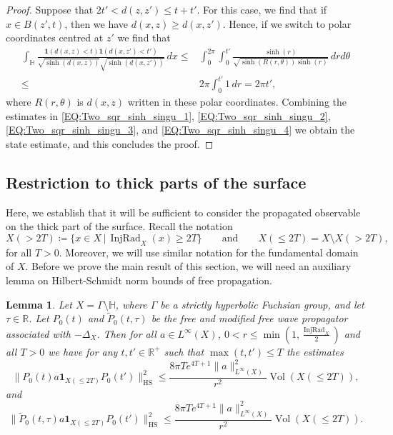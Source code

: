 \documentclass[11pt,twoside,reqno]{amsart}
\newcommand{\R}{\mathbb{R}}
\newcommand{\bH}{\mathbb{H}}
\newcommand{\1}{\mathrm{\mathbf{1}}}
\newcommand{\bHS}{\mathrm{HS}}
\DeclareMathOperator{\Vol}{Vol}
\DeclareMathOperator{\InjRad}{InjRad}
\numberwithin{equation}{section}
\theoremstyle{plain}
\newtheorem{lemma}[thm]{Lemma}
\theoremstyle{definition}
\theoremstyle{remark}
\begin{document}
\begin{proof}
Suppose that $2t'<d(z,z') \leq t+t'$. For this case, we find that if $x\in B(z',t)$, then we have $d(x,z)\geq d(x,z')$. Hence, if we switch to polar coordinates centred at $z'$ we find that
\begin{equation}\label{EQ:Two_sqr_sinh_singu_4}
    \begin{aligned}
        \int_{\bH} \frac{\boldsymbol{1}(d(x,z)<t)\boldsymbol{1}(d(x,z')<t')}{\sqrt{\sinh(d(x,z)) }\sqrt{\sinh(d(x,z')) }} \, d x  \leq{}&  \int_0^{2\pi} \int_0^{t'} \frac{\sinh(r)}{\sqrt{\sinh(R(r,\theta)) \sinh(r)}} \, d r d\theta 
        \\
        \leq{}& 2\pi   \int_0^{t'} 1 \, d r = 2\pi t', 
    \end{aligned}
\end{equation}
where $R(r,\theta)$ is $d(x,z)$ written in these polar coordinates. Combining the estimates in \eqref{EQ:Two_sqr_sinh_singu_1}, \eqref{EQ:Two_sqr_sinh_singu_2}, \eqref{EQ:Two_sqr_sinh_singu_3}, and \eqref{EQ:Two_sqr_sinh_singu_4} we obtain the state estimate, and this concludes the proof. 
\end{proof}

\subsection{Restriction to thick parts of the surface} 

Here, we establish that it will be sufficient to consider the propagated observable on the thick part of the surface. Recall the notation
%
\begin{equation*}
    X(> 2T) \coloneqq \{ x\in X \,|\, \InjRad_X(x) \geq 2T \} \qquad\text{and}\qquad X(\leq 2T) = X\setminus X(> 2T),
\end{equation*}
for all $T>0$. Moreover, we will use similar notation for the fundamental domain of $X$. Before we prove the main result of this section, we will need an auxiliary lemma on Hilbert-Schmidt norm bounds of free propagation. 

\begin{lemma}\label{LE:free_propagation_restriction_1}
    Let $X=\Gamma\setminus \bH$, where $\Gamma$ be a strictly hyperbolic Fuchsian group, and let $\tau\in\R$. Let $P_0(t)$ and $\widetilde{P}_0(t,\tau)$ be the free and modified free wave propagator associated with $-\Delta_X$. Then for all $a\in L^\infty(X)$, $0<r\leq \min(1, \frac{\InjRad_X}{2})$ and all $T>0$ we have for any $t,t'\in \R^+$ such that $\max(t,t')\leq T$ the estimates
    \begin{equation*}
        \big\lVert  P_0(t) a \boldsymbol{1}_{X(\leq2T)} P_0(t')   \big\rVert_{\bHS}^2 \leq \frac{8\pi T e^{4T+1} \lVert a \rVert^2_{L^\infty(X)}}{r^2} \Vol(X(\leq2T)),
    \end{equation*}
    and
    \begin{equation*}
        \big\lVert  \widetilde{P}_0(t,\tau) a \boldsymbol{1}_{X(\leq2T)} P_0(t')   \big\rVert_{\bHS}^2 \leq \frac{8\pi T e^{4T+1} \lVert a \rVert^2_{L^\infty(X)}}{r^2} \Vol(X(\leq2T)).
    \end{equation*}
\end{lemma}
\end{document}
